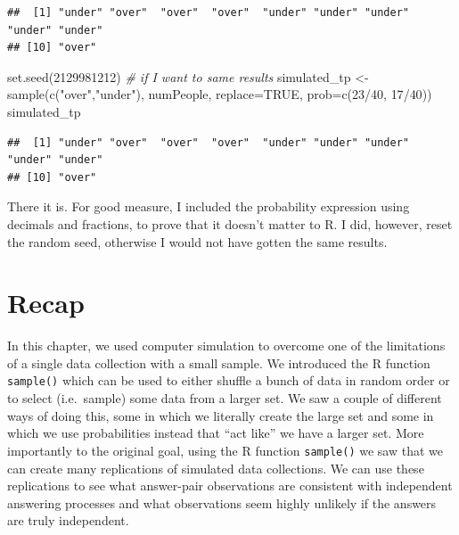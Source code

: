 \documentclass[
  openany]{book}
\newenvironment{Shaded}{\begin{snugshade}}{\end{snugshade}}
\newcommand{\AttributeTok}[1]{\textcolor[rgb]{0.77,0.63,0.00}{#1}}
\newcommand{\CommentTok}[1]{\textcolor[rgb]{0.56,0.35,0.01}{\textit{#1}}}
\newcommand{\ConstantTok}[1]{\textcolor[rgb]{0.00,0.00,0.00}{#1}}
\newcommand{\DecValTok}[1]{\textcolor[rgb]{0.00,0.00,0.81}{#1}}
\newcommand{\FunctionTok}[1]{\textcolor[rgb]{0.00,0.00,0.00}{#1}}
\newcommand{\NormalTok}[1]{#1}
\newcommand{\OtherTok}[1]{\textcolor[rgb]{0.56,0.35,0.01}{#1}}
\newcommand{\SpecialCharTok}[1]{\textcolor[rgb]{0.00,0.00,0.00}{#1}}
\newcommand{\StringTok}[1]{\textcolor[rgb]{0.31,0.60,0.02}{#1}}
\begin{document}
\begin{verbatim}
##  [1] "under" "over"  "over"  "over"  "under" "under" "under" "under" "under"
## [10] "over"
\end{verbatim}

\begin{Shaded}
\begin{Highlighting}[]
\FunctionTok{set.seed}\NormalTok{(}\DecValTok{2129981212}\NormalTok{) }\CommentTok{\# if I want to same results}
\NormalTok{simulated\_tp }\OtherTok{\textless{}{-}} \FunctionTok{sample}\NormalTok{(}\FunctionTok{c}\NormalTok{(}\StringTok{"over"}\NormalTok{,}\StringTok{"under"}\NormalTok{), numPeople, }\AttributeTok{replace=}\ConstantTok{TRUE}\NormalTok{, }\AttributeTok{prob=}\FunctionTok{c}\NormalTok{(}\DecValTok{23}\SpecialCharTok{/}\DecValTok{40}\NormalTok{, }\DecValTok{17}\SpecialCharTok{/}\DecValTok{40}\NormalTok{))}
\NormalTok{simulated\_tp}
\end{Highlighting}
\end{Shaded}

\begin{verbatim}
##  [1] "under" "over"  "over"  "over"  "under" "under" "under" "under" "under"
## [10] "over"
\end{verbatim}

There it is. For good measure, I included the probability expression using decimals and fractions, to prove that it doesn't matter to R. I did, however, reset the random seed, otherwise I would not have gotten the same results.

\hypertarget{recap}{%
\section*{Recap}\label{recap}}

In this chapter, we used computer simulation to overcome one of the limitations of a single data collection with a small sample. We introduced the R function \texttt{sample()} which can be used to either shuffle a bunch of data in random order or to select (i.e.~sample) some data from a larger set. We saw a couple of different ways of doing this, some in which we literally create the large set and some in which we use probabilities instead that ``act like'' we have a larger set. More importantly to the original goal, using the R function \texttt{sample()} we saw that we can create many replications of simulated data collections. We can use these replications to see what answer-pair observations are consistent with independent answering processes and what observations seem highly unlikely if the answers are truly independent.
\end{document}
